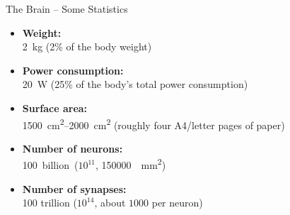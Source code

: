 \documentclass[handout,aspectratio=169]{beamer}
\begin{document}
\begin{frame}{The Brain -- Some Statistics}
	\begin{itemize}
		\item \textbf{Weight:}\\
		\SI{2}{\kilogram} (2\% of the body weight)
		\item \textbf{Power consumption:}\\
		\SI{20}{\watt} (25\% of the body's total power consumption)
		\item \textbf{Surface area:}\\
		\SIrange{1500}{2000}{\centi\metre\squared} (roughly four A4/letter pages of paper)
		\item \textbf{Number of neurons:}\\
		\SI{100} billion ($10^{11}$, \SI{150000}{\per\milli\metre\squared})
		\item \textbf{Number of synapses:}\\
		100 trillion ($10^{14}$, about $1000$ per neuron)
	\end{itemize}	
\end{frame}

\end{document}
